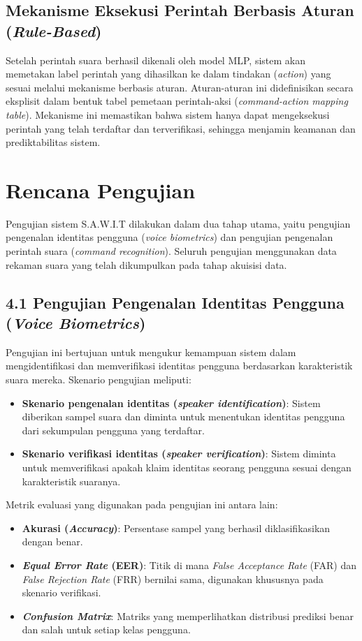 \subsection*{Mekanisme Eksekusi Perintah Berbasis Aturan (\textit{Rule-Based})}

Setelah perintah suara berhasil dikenali oleh model MLP, sistem akan memetakan label perintah yang dihasilkan ke dalam tindakan (\textit{action}) yang sesuai melalui mekanisme berbasis aturan. Aturan-aturan ini didefinisikan secara eksplisit dalam bentuk tabel pemetaan perintah-aksi (\textit{command-action mapping table}). Mekanisme ini memastikan bahwa sistem hanya dapat mengeksekusi perintah yang telah terdaftar dan terverifikasi, sehingga menjamin keamanan dan prediktabilitas sistem.

\section{Rencana Pengujian}

Pengujian sistem S.A.W.I.T dilakukan dalam dua tahap utama, yaitu pengujian pengenalan identitas pengguna (\textit{voice biometrics}) dan pengujian pengenalan perintah suara (\textit{command recognition}). Seluruh pengujian menggunakan data rekaman suara yang telah dikumpulkan pada tahap akuisisi data.

\subsection*{4.1 Pengujian Pengenalan Identitas Pengguna (\textit{Voice Biometrics})}

Pengujian ini bertujuan untuk mengukur kemampuan sistem dalam mengidentifikasi dan memverifikasi identitas pengguna berdasarkan karakteristik suara mereka. Skenario pengujian meliputi:

\begin{itemize}
    \item \textbf{Skenario pengenalan identitas (\textit{speaker identification})}: Sistem diberikan sampel suara dan diminta untuk menentukan identitas pengguna dari sekumpulan pengguna yang terdaftar.
    \item \textbf{Skenario verifikasi identitas (\textit{speaker verification})}: Sistem diminta untuk memverifikasi apakah klaim identitas seorang pengguna sesuai dengan karakteristik suaranya.
\end{itemize}

Metrik evaluasi yang digunakan pada pengujian ini antara lain:
\begin{itemize}
    \item \textbf{Akurasi (\textit{Accuracy})}: Persentase sampel yang berhasil diklasifikasikan dengan benar.
    \item \textbf{\textit{Equal Error Rate} (EER)}: Titik di mana \textit{False Acceptance Rate} (FAR) dan \textit{False Rejection Rate} (FRR) bernilai sama, digunakan khususnya pada skenario verifikasi.
    \item \textbf{\textit{Confusion Matrix}}: Matriks yang memperlihatkan distribusi prediksi benar dan salah untuk setiap kelas pengguna.
\end{itemize}

